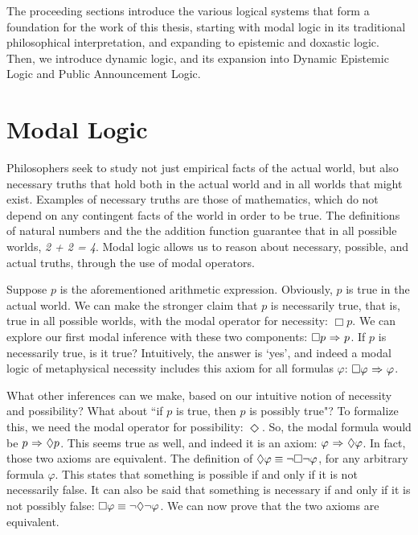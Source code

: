 The proceeding sections introduce the various logical systems that form a foundation for the work of this thesis, starting with modal logic in its traditional philosophical interpretation, and expanding to epistemic and doxastic logic. Then, we introduce dynamic logic, and its expansion into Dynamic Epistemic Logic and Public Announcement Logic.

\section{Modal Logic}
Philosophers seek to study not just empirical facts of the actual world, but also necessary truths that hold both in the actual world and in all worlds that might exist. Examples of necessary truths are those of mathematics, which do not depend on any contingent facts of the world in order to be true. The definitions of natural numbers and the the addition function guarantee that in all possible worlds, \emph{2 + 2 = 4}. Modal logic allows us to reason about necessary, possible, and actual truths, through the use of modal operators.

Suppose $p$ is the aforementioned arithmetic expression. Obviously, $p$ is true in the actual world. We can make the stronger claim that $p$ is necessarily true, that is, true in all possible worlds, with the modal operator for necessity: $\Box p$. We can explore our first modal inference with these two components: $\Box p {\ \Rightarrow \ } p$. If $p$ is necessarily true, is it true? Intuitively, the answer is `yes', and indeed a modal logic of metaphysical necessity includes this axiom for all formulas $\varphi$: $\Box \varphi {\ \Rightarrow \ } \varphi$. 

What other inferences can we make, based on our intuitive notion of necessity and possibility? What about ``if $p$ is true, then $p$ is possibly true"? To formalize this, we need the modal operator for possibility: $\Diamond$. So, the modal formula would be $p {\ \Rightarrow \ } \Diamond p$. This seems true as well, and indeed it is an axiom: $\varphi {\ \Rightarrow \ } \Diamond \varphi$. In fact, those two axioms are equivalent. The definition of $\Diamond \varphi \equiv {\neg} \Box {\neg} \varphi$, for any arbitrary formula $\varphi$. This states that something is possible if and only if it is not necessarily false. It can also be said that something is necessary if and only if it is not possibly false: $\Box \varphi \equiv {\neg} \Diamond {\neg} \varphi$. We can now prove that the two axioms are equivalent.

